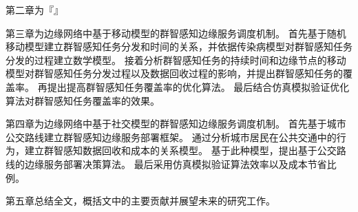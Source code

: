 第二章为『』

第三章为边缘网络中基于移动模型的群智感知边缘服务调度机制。
首先基于随机移动模型建立群智感知任务分发和时间的关系，并依据传染病模型对群智感知任务分发的过程建立数学模型。
接着分析群智感知任务的持续时间和边缘节点的移动模型对群智感知任务分发过程以及数据回收过程的影响，并提出群智感知任务的覆盖率。
再提出提高群智感知任务覆盖率的优化算法。
最后结合仿真模拟验证优化算法对群智感知任务覆盖率的效果。

第四章为边缘网络中基于社交模型的群智感知边缘服务调度机制。
首先基于城市公交路线建立群智感知边缘服务部署框架。
通过分析城市居民在公共交通中的行为，建立群智感知数据回收和成本的关系模型。
基于此种模型，提出基于公交路线的边缘服务部署决策算法。
最后采用仿真模拟验证算法效率以及成本节省比例。

第五章总结全文，概括文中的主要贡献并展望未来的研究工作。
